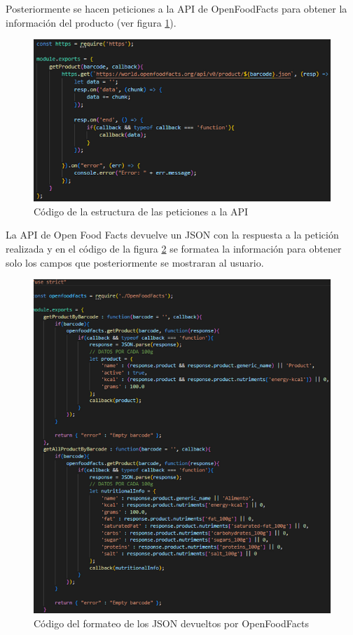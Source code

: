 Posteriormente se hacen peticiones a la API de OpenFoodFacts para obtener la información del producto (ver figura \ref{fig:peticionapi}).

\begin{figure}[H]
    \centering
    \includegraphics[width=\textwidth]{Images/Capitulo7/peticionapi.png}
        \caption{Código de la estructura de las peticiones a la API}
    \label{fig:peticionapi}
\end{figure}

La API de Open Food Facts devuelve un JSON con la respuesta a la petición realizada y en el código de la figura \ref{fig:returnapi} se formatea la información para obtener solo los campos que posteriormente se mostraran al usuario.

\begin{figure}[H]
    \centering
    \includegraphics[width=\textwidth]{Images/Capitulo7/returnapi.png}
        \caption{Código del formateo de los JSON devueltos por OpenFoodFacts}
    \label{fig:returnapi}
\end{figure}

